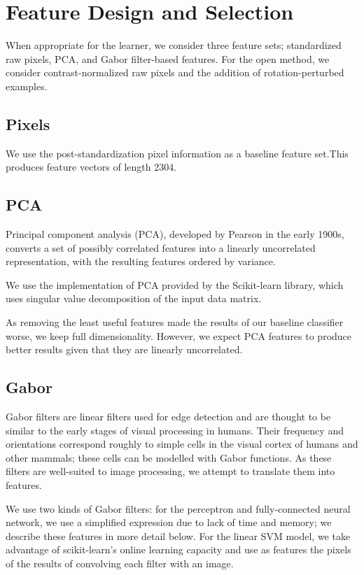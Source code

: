\documentclass{acm_proc_article-sp}
\begin{document}
\section{Feature Design and Selection}
When appropriate for the learner, we consider three feature sets; standardized raw pixels, PCA, and Gabor filter-based features. For the open method, we consider contrast-normalized raw pixels and the addition of rotation-perturbed examples.

\subsection{Pixels}
We use the post-standardization pixel information as a baseline feature set.This produces feature vectors of length 2304. 

\subsection{PCA}
Principal component analysis (PCA), developed by Pearson in the early 1900s\cite{Pearson}, converts a set of possibly correlated features into a linearly uncorrelated representation, with the resulting features ordered by variance. 

We use the implementation of PCA provided by the Scikit-learn library\cite{scikit-learn}, which uses singular value decomposition of the input data matrix.

As removing the least useful features made the results of our baseline classifier worse, we keep full dimensionality. However, we expect PCA features to produce better results given that they are linearly uncorrelated.

\subsection{Gabor}
Gabor filters are linear filters used for edge detection and are thought to be similar to the early stages of visual processing in humans. Their frequency and orientations correspond roughly to simple cells in the visual cortex of humans and other mammals; these cells can be modelled with Gabor functions.\cite{Jones}\cite{Marvcelja} As these filters are well-suited to image processing, we attempt to translate them into features.

We use two kinds of Gabor filters: for the perceptron and fully-connected neural network, we use a simplified expression due to lack of time and memory; we describe these features in more detail below. For the linear SVM model, we take advantage of scikit-learn's online learning capacity and use as features the pixels of the results of convolving each filter with an image.
\end{document}
